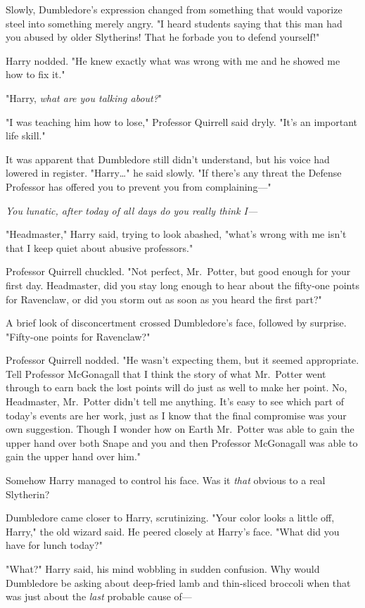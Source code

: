 Slowly, Dumbledore's expression changed from something that would vaporize 
steel into something merely angry. "I heard students saying that this man had 
you abused by older Slytherins! That he forbade you to defend yourself!"

Harry nodded. "He knew exactly what was wrong with me and he showed me how to 
fix it."

"Harry, \emph{what are you talking about?}"

"I was teaching him how to lose," Professor Quirrell said dryly. "It's an 
important life skill."

It was apparent that Dumbledore still didn't understand, but his voice had 
lowered in register. "Harry{\ldots}" he said slowly. "If there's any threat the 
Defense Professor has offered you to prevent you from complaining---"

\emph{You lunatic, after today of all days do you really think I---}

"Headmaster," Harry said, trying to look abashed, "what's wrong with me isn't 
that I keep quiet about abusive professors."

Professor Quirrell chuckled. "Not perfect, Mr.~Potter, but good enough for your 
first day. Headmaster, did you stay long enough to hear about the fifty-one 
points for Ravenclaw, or did you storm out as soon as you heard the first part?"

A brief look of disconcertment crossed Dumbledore's face, followed by surprise. 
"Fifty-one points for Ravenclaw?"

Professor Quirrell nodded. "He wasn't expecting them, but it seemed 
appropriate. Tell Professor McGonagall that I think the story of what 
Mr.~Potter went through to earn back the lost points will do just as well to 
make her point. No, Headmaster, Mr.~Potter didn't tell me anything. It's easy 
to see which part of today's events are her work, just as I know that the final 
compromise was your own suggestion. Though I wonder how on Earth Mr.~Potter was 
able to gain the upper hand over both Snape and you and then Professor 
McGonagall was able to gain the upper hand over him."

Somehow Harry managed to control his face. Was it \emph{that} obvious to a real 
Slytherin?

Dumbledore came closer to Harry, scrutinizing. "Your color looks a little off, 
Harry," the old wizard said. He peered closely at Harry's face. "What did you 
have for lunch today?"

"What?" Harry said, his mind wobbling in sudden confusion. Why would Dumbledore 
be asking about deep-fried lamb and thin-sliced broccoli when that was just 
about the \emph{last} probable cause of---

